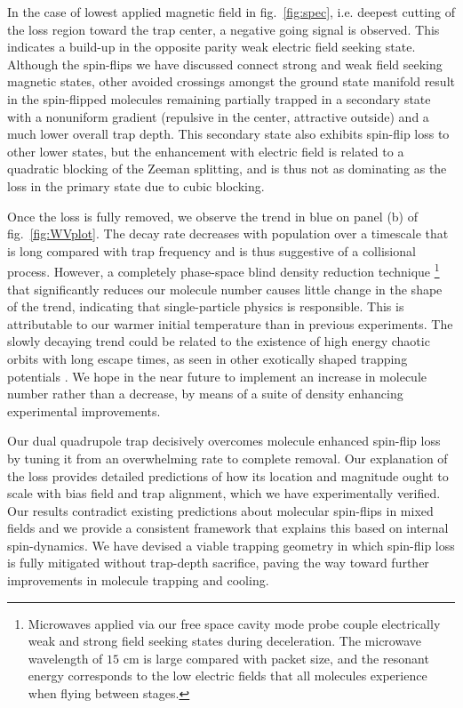 \documentclass[%
 reprint,
groupedaddress,
 amsmath,amssymb,
 aps,
prl,
]{revtex4-1}
\begin{document}
In the case of lowest applied magnetic field in fig.~\ref{fig:spec}, i.e. deepest cutting of the loss region toward the trap center, a negative going signal is observed. This indicates a build-up in the opposite parity weak electric field seeking state. Although the spin-flips we have discussed connect strong and weak field seeking magnetic states, other avoided crossings amongst the ground state manifold result in the spin-flipped molecules remaining partially trapped in a secondary state with a nonuniform gradient (repulsive in the center, attractive outside) and a much lower overall trap depth. This secondary state also exhibits spin-flip loss to other lower states, but the enhancement with electric field is related to a quadratic blocking of the Zeeman splitting, and is thus not as dominating as the loss in the primary state due to cubic blocking.

Once the loss is fully removed, we observe the trend in blue on panel (b) of fig.~\ref{fig:WVplot}. The decay rate decreases with population over a timescale that is long compared with trap frequency and is thus suggestive of a collisional process. However, a completely phase-space blind density reduction technique \footnote{Microwaves applied via our free space cavity mode probe couple electrically weak and strong field seeking states during deceleration. The microwave wavelength of $15\text{ cm}$ is large compared with packet size, and the resonant energy corresponds to the low electric fields that all molecules experience when flying between stages.} that significantly reduces our molecule number causes little change in the shape of the trend, indicating that single-particle physics is responsible. This is attributable to our warmer initial temperature than in previous experiments. The slowly decaying trend could be related to the existence of high energy chaotic orbits with long escape times, as seen in other exotically shaped trapping potentials \cite{Gonzalez-Ferez2014}. We hope in the near future to implement an increase in molecule number rather than a decrease, by means of a suite of density enhancing experimental improvements.

Our dual quadrupole trap decisively overcomes molecule enhanced spin-flip loss by tuning it from an overwhelming rate to complete removal. Our explanation of the loss provides detailed predictions of how its location and magnitude ought to scale with bias field and trap alignment, which we have experimentally verified. Our results contradict existing predictions about molecular spin-flips in mixed fields and we provide a consistent framework that explains this based on internal spin-dynamics. We have devised a viable trapping geometry in which spin-flip loss is fully mitigated without trap-depth sacrifice, paving the way toward further improvements in molecule trapping and cooling.
\end{document}
